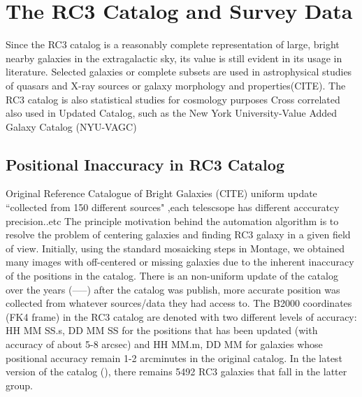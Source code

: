 \documentclass[5p]{elsarticle}
\begin{document}
\section{The RC3 Catalog and Survey Data}

	Since the RC3 catalog is a reasonably complete representation of large, bright nearby galaxies in the extragalactic sky, its 
value is still evident in its usage in literature. Selected galaxies or complete subsets are used in astrophysical studies of  quasars and X-ray sources%
 or  galaxy morphology and properties(CITE).  The RC3 catalog is also statistical studies  for cosmology purposes Cross correlated also used in  Updated Catalog, such as the New York University-Value Added Galaxy Catalog (NYU-VAGC)

	\subsection{Positional Inaccuracy in RC3 Catalog}
Original Reference Catalogue of Bright Galaxies (CITE)
	uniform update ``collected from 150 different sources" ,each telescsope has different acccuratcy precision..etc
	The principle motivation behind the automation algorithm is to resolve the problem of centering galaxies and finding RC3 galaxy in a given field of view. Initially, using the standard mosaicking steps in Montage, we obtained many images with  off-centered or missing galaxies due to the inherent inaccuracy of the positions in the catalog. 
There is an non-uniform update of the catalog over the years (-----) after the catalog was publish, more accurate position was collected from whatever sources/data they had access to.
The B2000 coordinates (FK4 frame) in the RC3 catalog are denoted with two different levels of accuracy: HH MM SS.s, DD MM SS for the positions that has been updated  (with accuracy of about 5-8 arcsec) and  HH MM.m, DD MM for galaxies whose positional accuracy remain  1-2 arcminutes in the original catalog.  In the latest version of the catalog (\citet{rc31991}), there remains 5492 RC3 galaxies that fall in the latter group.
\end{document}

